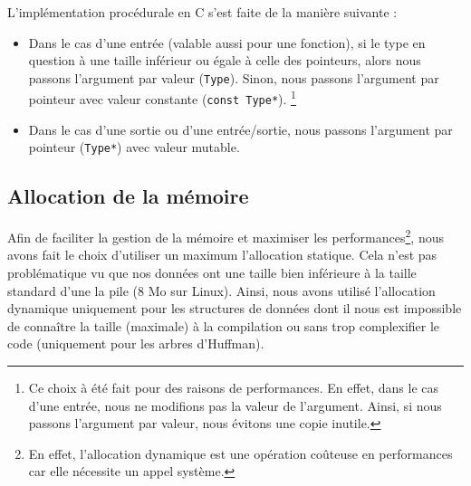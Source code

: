 L'implémentation procédurale en C s'est faite de la manière suivante :

\begin{itemize}
    \item Dans le cas d'une entrée (valable aussi pour une fonction), si le type en question à une taille inférieur ou égale à celle des pointeurs, alors nous passons l'argument par valeur (\texttt{Type}).
    Sinon, nous passons l'argument par pointeur avec valeur constante (\texttt{const Type*}).
    \footnote{Ce choix à été fait pour des raisons de performances. En effet, dans le cas d'une entrée, nous ne modifions pas la valeur de l'argument. Ainsi, si nous passons l'argument par valeur, nous évitons une copie inutile.}
    \item Dans le cas d'une sortie ou d'une entrée/sortie, nous passons l'argument par pointeur (\texttt{Type*}) avec valeur mutable.
\end{itemize}

\subsection{Allocation de la mémoire}

Afin de faciliter la gestion de la mémoire et maximiser les performances\footnote{En effet, l'allocation dynamique est une opération coûteuse en performances car elle nécessite un appel système.},
nous avons fait le choix d'utiliser un maximum l'allocation statique.
Cela n'est pas problématique vu que nos données ont une taille bien inférieure à la taille standard d'une la pile (8 Mo sur Linux).
Ainsi, nous avons utilisé l'allocation dynamique uniquement pour les structures de données dont il nous est impossible de connaître la taille (maximale) à la compilation ou sans trop complexifier le code
(uniquement pour les arbres d'Huffman).
